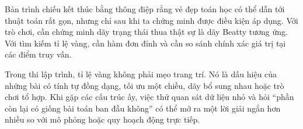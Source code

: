 \documentclass[11pt]{article}
\begin{document}
Bản trình chiếu kết thúc bằng thông điệp rằng vẻ đẹp toán học có thể dẫn tới
thuật toán rất gọn, nhưng chỉ sau khi ta chứng minh được điều kiện áp dụng.
Với trò chơi, cần chứng minh dãy trạng thái thua thật sự là dãy Beatty tương
ứng. Với tìm kiếm tỉ lệ vàng, cần hàm đơn đỉnh và cần so sánh chính xác giá
trị tại các điểm truy vấn.

Trong thi lập trình, tỉ lệ vàng không phải mẹo trang trí. Nó là dấu hiệu của
những bài có tính tự đồng dạng, tối ưu một chiều, dãy bổ sung nhau hoặc trò
chơi tổ hợp. Khi gặp các cấu trúc ấy, việc thử quan sát dữ liệu nhỏ và hỏi
``phần còn lại có giống bài toán ban đầu không'' có thể mở ra một lời giải
ngắn hơn nhiều so với mô phỏng hoặc quy hoạch động trực tiếp.
\end{document}
